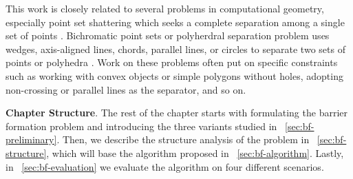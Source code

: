 This work is closely related to several problems in computational geometry, especially point set shattering which seeks a complete separation among a single set of points \cite{freimer1991complexity, har2020separating}. 
Bichromatic point sets or polyherdral separation problem uses wedges, axis-aligned lines, chords, parallel lines, or circles to separate two sets of points or polyhedra \cite{devillers2001separating,armaselu2017geometric,boissonnat2001circular, demaine2005separating}. 
Work on these problems often put on specific constraints such as working with convex objects or simple polygons without holes, adopting non-crossing or parallel lines as the separator, and so on. 

\noindent \textbf{Chapter Structure}.
The rest of the chapter starts with formulating the barrier formation problem and 
introducing the three variants studied in ~\ref{sec:bf-preliminary}. 
Then, we describe the structure analysis of the problem in ~\ref{sec:bf-structure}, which will base the algorithm
proposed in ~\ref{sec:bf-algorithm}. Lastly, in ~\ref{sec:bf-evaluation} we evaluate the algorithm on four different scenarios. %



